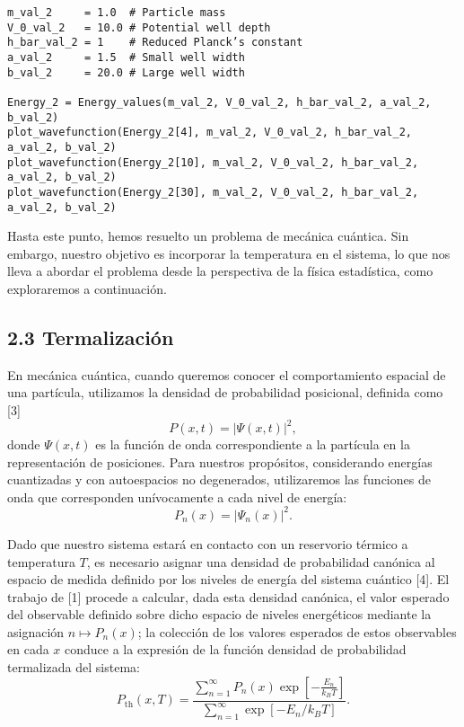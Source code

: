 \documentclass[11pt]{article}
\begin{document}
\begin{verbatim}
m_val_2     = 1.0  # Particle mass
V_0_val_2   = 10.0 # Potential well depth
h_bar_val_2 = 1    # Reduced Planck’s constant
a_val_2     = 1.5  # Small well width
b_val_2     = 20.0 # Large well width

Energy_2 = Energy_values(m_val_2, V_0_val_2, h_bar_val_2, a_val_2, b_val_2)
plot_wavefunction(Energy_2[4], m_val_2, V_0_val_2, h_bar_val_2, a_val_2, b_val_2)
plot_wavefunction(Energy_2[10], m_val_2, V_0_val_2, h_bar_val_2, a_val_2, b_val_2)
plot_wavefunction(Energy_2[30], m_val_2, V_0_val_2, h_bar_val_2, a_val_2, b_val_2)
\end{verbatim}

\label{orga089052}
\begin{center}

\end{center}
\begin{center}

\end{center}
\begin{center}

\end{center}

Hasta este punto, hemos resuelto un problema de mecánica cuántica. Sin
embargo, nuestro objetivo es incorporar la temperatura en el sistema, lo
que nos lleva a abordar el problema desde la perspectiva de la física
estadística, como exploraremos a continuación.
\subsection{\textbf{2.3 Termalización}}
\label{sec:orgdfb3ee8}
En mecánica cuántica, cuando queremos conocer el comportamiento espacial
de una partícula, utilizamos la densidad de probabilidad posicional,
definida como [3]
$$ P(x,t) = |\Psi(x,t)|^2, $$
donde \(\Psi(x,t)\) es la función de onda correspondiente a la partícula en la
representación de posiciones. Para nuestros propósitos,
considerando energías cuantizadas y con autoespacios no degenerados,
utilizaremos las funciones de onda que corresponden unívocamente a cada nivel de
energía:
$$ P_n(x) = |\Psi_n(x)|^2. $$

Dado que nuestro sistema estará en contacto con un reservorio térmico a
temperatura \(T\), es necesario asignar una densidad de probabilidad canónica al
espacio de medida definido por los niveles de energía del sistema cuántico [4]. El
trabajo de [1] procede a calcular, dada esta densidad canónica, el valor
esperado del observable definido sobre dicho espacio de niveles energéticos
mediante la asignación \(n \mapsto P_n(x)\); la colección de los valores
esperados de estos observables en cada \(x\) conduce a la expresión de
la función densidad de probabilidad termalizada del sistema:
$$
 P_\text{th}(x,T) = \frac{\sum_{n=1}^{\infty}P_n(x)\exp\left[-\frac{E_n}{k_BT}\right]}{\sum_{n=1}^{\infty} \exp[-E_n/k_BT]}.
$$
\end{document}
